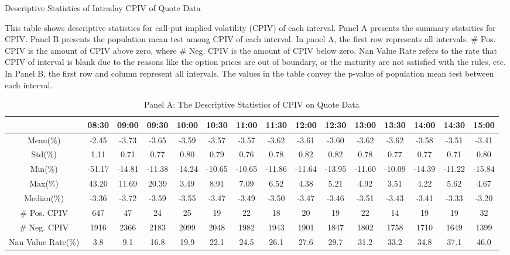 \begin{table}[h]
\centering
\caption{Descriptive Statistics of Intraday CPIV of Quote Data}\label{table:stats_of_CPIV}
\begin{threeparttable}

\medskip


{\scriptsize 
This table shows descriptive statistics for call-put implied volatility (CPIV) of each interval. Panel A presents the summary statsitics for CPIV. Panel B presents the population mean test among CPIV of each interval. In panel A, the first row represents all intervals.  \# Pos. CPIV is the amount of CPIV above zero, where \# Neg. CPIV is the amount of CPIV below zero. Nan Value Rate refers to the rate that CPIV of interval is blank due to the reasons like the option prices are out of boundary, or the maturity are not satisfied with the rules, etc. In Panel B, the first row and column represent all intervals. The values in the table convey the p-value of population mean test between each interval. 
}
\medskip
\begin{subtable}[t]{\linewidth}

\caption{Panel A: The Descriptive Statistics of CPIV on Quote Data }
\tiny
\begin{tabular}{ccccccccccccccc}
\toprule
\textbf{}        & 08:30 & 09:00 & 09:30 & 10:00 & 10:30 & 11:00 & 11:30 & 12:00 & 12:30 & 13:00 & 13:30 & 14:00 & 14:30 & 15:00 \\ \midrule
Mean(\%)         & -2.45 & -3.73 & -3.65 & -3.59 & -3.57 & -3.57 & -3.62 & -3.61 & -3.60 & -3.62 & -3.62 & -3.58 & -3.51 & -3.41 \\
Std(\%)          & 1.11  & 0.71  & 0.77  & 0.80  & 0.79  & 0.76  & 0.78  & 0.82  & 0.82  & 0.78  & 0.77  & 0.77  & 0.71  & 0.80  \\
Min(\%)          & -51.17 & -14.81 & -11.38 & -14.24 & -10.65 & -10.65 & -11.86 & -11.64 & -13.95 & -11.60 & -10.09 & -14.39 & -11.22 & -15.84 \\
Max(\%)          & 43.20  & 11.69  & 20.39  & 3.49   & 8.91   & 7.09   & 6.52   & 4.38   & 5.21   & 4.92   & 3.51   & 4.22   & 5.62   & 4.67   \\
Median(\%)       & -3.36  & -3.72  & -3.59  & -3.55  & -3.47  & -3.49  & -3.50  & -3.47  & -3.46  & -3.51  & -3.43  & -3.41  & -3.33  & -3.20  \\
\# Pos. CPIV     & 647   & 47    & 24    & 25    & 19    & 22    & 18    & 20    & 19    & 22    & 14    & 19    & 19    & 32    \\
\# Neg. CPIV     & 1916  & 2366  & 2183  & 2099  & 2048  & 1982  & 1943  & 1901  & 1847  & 1802  & 1758  & 1710  & 1649  & 1399  \\
Nan Value Rate(\%) & 3.8   & 9.1   & 16.8  & 19.9  & 22.1  & 24.5  & 26.1  & 27.6  & 29.7  & 31.2  & 33.2  & 34.8  & 37.1  & 46.0  \\ \bottomrule
\end{tabular}
\end{subtable}


\end{threeparttable}
\end{table}
